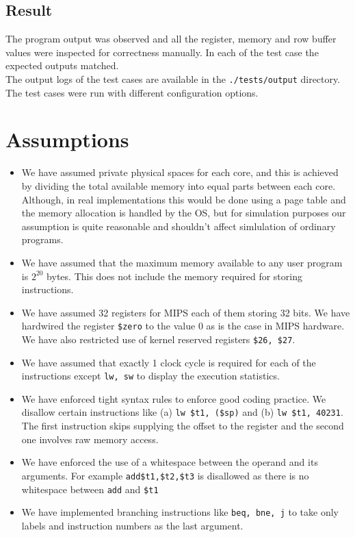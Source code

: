 \documentclass[hidelinks,12pt]{article}
\begin{document}
\subsection{Result}
The program output was observed and all the register, memory and row buffer values were inspected for correctness manually. In each of the test case the expected outputs matched.\\[0.2cm]
The output logs of the test cases are available in the \verb|./tests/output| directory. The test cases were run with different configuration options.

\section{Assumptions}
\begin{itemize}
    \item We have assumed private physical spaces for each core, and this is achieved by dividing the total available memory into equal parts between each core. Although, in real implementations this would be done using a page table and the memory allocation is handled by the OS, but for simulation purposes our assumption is quite reasonable and shouldn't affect simlulation of ordinary programs.
    \item We have assumed that the maximum memory available to any user program is $2^{20}$ bytes. This does not include the memory required for storing instructions.
    \item We have assumed 32 registers for MIPS each of them storing 32 bits. We have hardwired the register \verb|$zero| to the value $0$ as is the case in MIPS hardware. We have also restricted use of kernel reserved registers \verb|$26, $27|.
    \item We have assumed that exactly 1 clock cycle is required for each of the instructions except \verb|lw, sw| to display the execution statistics.
    \item We have enforced tight syntax rules to enforce good coding practice. We disallow certain instructions like (a) \verb|lw $t1, ($sp)| and (b) \verb|lw $t1, 40231|.
          The first instruction skips supplying the offset to the register and the second one involves raw memory access.
    \item We have enforced the use of a whitespace between the operand and its arguments. For example \verb|add$t1,$t2,$t3| is disallowed as there is no whitespace between \verb|add| and \verb|$t1|
    \item We have implemented branching instructions like \verb|beq, bne, j| to take only labels and instruction numbers as the last argument.
\end{itemize}
\end{document}
